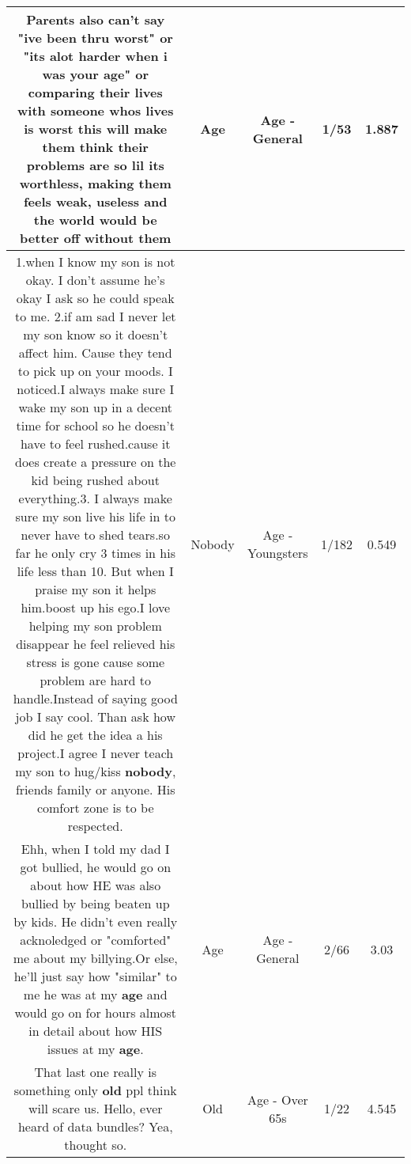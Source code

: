 \documentclass[11pt]{article}
\newlength\mylength
\begin{document}
\begin{center}
\begin{longtable}{|C{.65\mylength}|C{.30\mylength}|C{.12\mylength}|C{.12\mylength}|C{.12\mylength}|}
  \small Parents also can't say "ive been thru worst" or "its alot harder when i was your \textbf{age}" or comparing their lives with someone whos lives is worst this will make them think their problems are so lil its worthless, making them feels weak, useless and the world would be better off without them\normalsize   & Age & Age - General & 1/53 & 1.887 \\  \hline
  \small 1.when I know my son is not okay. I don't assume he's okay I ask so he could speak to me. 2.if am sad I never let my son know so it doesn't affect him. Cause they tend to pick up on your moods. I noticed.I always make sure I wake my son up in a decent time for school so he doesn't have to feel rushed.cause it does create a pressure on the kid being rushed about everything.3. I always make sure my son live his life in to never have to shed tears.so far he only cry 3 times in his life less than 10. But when I praise my son it helps him.boost up his ego.I love helping my son problem disappear he feel relieved his stress is gone cause some problem are hard to handle.Instead of saying good job I say cool. Than ask how did he get the idea a his project.I agree I never teach my son to hug/kiss \textbf{nobody}, friends family or anyone. His comfort zone is to be respected.\normalsize   & Nobody & Age - Youngsters & 1/182 & 0.549 \\  \hline
  \small Ehh, when I told my dad I got bullied, he would go on about how HE was also bullied by being beaten up by kids. He didn't even really acknoledged or "comforted" me about my billying.Or else, he'll just say how "similar" to me he was at my \textbf{age} and would go on for hours almost in detail about how HIS issues at my \textbf{age}.\normalsize   & Age & Age - General & 2/66 & 3.03 \\  \hline
  \small That last one really is something only \textbf{old} ppl think will scare us. Hello, ever heard of data bundles? Yea, thought so.\normalsize   & Old & Age - Over 65s & 1/22 & 4.545 \\  \hline

\end{longtable}
\end{center}
\end{document}
